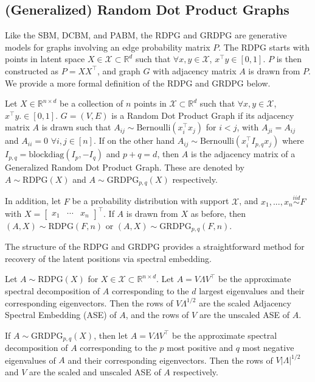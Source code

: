 \documentclass[
  11pt,
]{article}
\begin{document}
\hypertarget{generalized-random-dot-product-graphs}{%
\subsection{(Generalized) Random Dot Product
Graphs}\label{generalized-random-dot-product-graphs}}

Like the SBM, DCBM, and PABM, the RDPG and GRDPG are generative models
for graphs involving an edge probability matrix \(P\). The RDPG starts
with points in latent space \(X \in \mathcal{X} \subset \mathbb{R}^d\)
such that \(\forall x, y \in \mathcal{X}\), \(x^\top y \in [0, 1]\).
\(P\) is then constructed as \(P = X X^\top\), and graph \(G\) with
adjacency matrix \(A\) is drawn from \(P\). We provide a more formal
definition of the RDPG and GRDPG below.

\begin{definition}
Let $X \in \mathbb{R}^{n \times d}$ be a collection of $n$ points in $\mathcal{X} \subset \mathbb{R}^d$ such that $\forall x, y \in \mathcal{X}$, $x^\top y.\in [0, 1]$. $G = (V, E)$ is a Random Dot Product Graph if its adjacency matrix $A$ is drawn such that $A_{ij} \sim \text{Bernoulli}(x_i^\top x_j)$ for $i < j$, with $A_{ji} = A_{ij}$ and $A_{ii} = 0$ $\forall i, j \in [n]$. If on the other hand $A_{ij} \sim \text{Bernoulli}(x_i^\top I_{p, q} x_j)$ where $I_{p, q} = \text{blockdiag}(I_p, -I_q)$ and $p + q = d$, then $A$ is the adjacency matrix of a Generalized Random Dot Product Graph. These are denoted by $A \sim \text{RDPG}(X)$ and $A \sim \text{GRDPG}_{p, q}(X)$ respectively.

In addition, let $F$ be a probability distribution with support $\mathcal{X}$, and $x_1, ..., x_n \stackrel{iid}{\sim} F$ with $X = \begin{bmatrix} x_1 & \cdots & x_n \end{bmatrix}^\top$. If $A$ is drawn from $X$ as before, then $(A, X) \sim \text{RDPG}(F, n)$ or $(A, X) \sim \text{GRDPG}_{p, q}(F, n)$. 
\end{definition}

The structure of the RDPG and GRDPG provides a straightforward method
for recovery of the latent positions via spectral embedding.

\begin{definition}
Let $A \sim \text{RDPG}(X)$ for $X \in \mathcal{X} \subset \mathbb{R}^{n \times d}$. Let $A = V \Lambda V^\top$ be the approximate spectral decomposition of $A$ corresponding to the $d$ largest eigenvalues and their corresponding eigenvectors. Then the rows of $V \Lambda^{1/2}$ are the scaled Adjacency Spectral Embedding (ASE) of $A$, and the rows of $V$ are the unscaled ASE of $A$. 

If $A \sim \text{GRDPG}_{p, q}(X)$, then let $A = V \Lambda V^\top$ be the approximate spectral decomposition of $A$ corresponding to the $p$ most positive and $q$ most negative eigenvalues of $A$ and their corresponding eigenvectors. Then the rows of $V |\Lambda|^{1/2}$ and $V$ are the scaled and unscaled ASE of $A$ respectively.
\end{definition}
\end{document}
